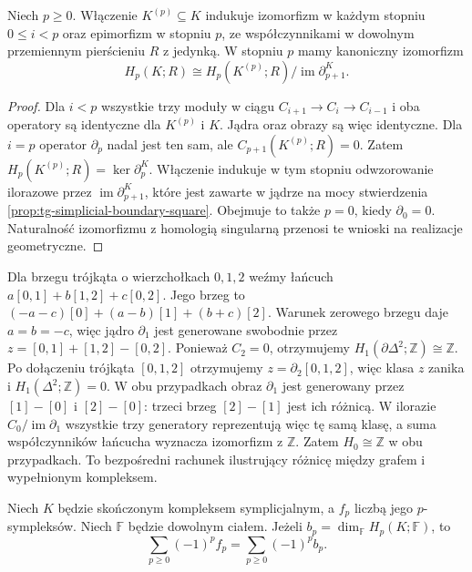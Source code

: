 \begin{wniosek}
\label{cor:tg-higher-skeleton-homology}
Niech $p\ge0$. Włączenie $K^{(p)}\subseteq K$
indukuje izomorfizm w każdym stopniu $0\le i<p$
oraz epimorfizm w stopniu $p$, ze współczynnikami
w dowolnym przemiennym pierścieniu $R$ z jedynką.
W stopniu $p$ mamy kanoniczny izomorfizm
\[
H_p(K;R)\cong
H_p(K^{(p)};R)/\operatorname{im}\partial_{p+1}^K.
\]
\end{wniosek}
\begin{proof}
Dla $i<p$ wszystkie trzy moduły w ciągu
$C_{i+1}\to C_i\to C_{i-1}$ i oba operatory
są identyczne dla $K^{(p)}$ i $K$.
Jądra oraz obrazy są więc identyczne.
Dla $i=p$ operator $\partial_p$ nadal jest ten sam,
ale $C_{p+1}(K^{(p)};R)=0$. Zatem
$H_p(K^{(p)};R)=\ker\partial_p^K$.
Włączenie indukuje w tym stopniu odwzorowanie
ilorazowe przez $\operatorname{im}\partial_{p+1}^K$,
które jest zawarte w jądrze na mocy
stwierdzenia \ref{prop:tg-simplicial-boundary-square}.
Obejmuje to także $p=0$, kiedy $\partial_0=0$.
Naturalność izomorfizmu z homologią singularną
przenosi te wnioski na realizacje geometryczne.
\end{proof}

\begin{przyklad}
Dla brzegu trójkąta o wierzchołkach $0,1,2$ weźmy łańcuch
$a[0,1]+b[1,2]+c[0,2]$. Jego brzeg to
$(-a-c)[0]+(a-b)[1]+(b+c)[2]$.
Warunek zerowego brzegu daje $a=b=-c$, więc jądro
$\partial_1$ jest generowane swobodnie przez
$z=[0,1]+[1,2]-[0,2]$. Ponieważ $C_2=0$, otrzymujemy
$H_1(\partial\Delta^2;\mathbb Z)\cong\mathbb Z$.
Po dołączeniu trójkąta $[0,1,2]$ otrzymujemy
$z=\partial_2[0,1,2]$, więc klasa $z$ zanika i
$H_1(\Delta^2;\mathbb Z)=0$. W obu przypadkach
obraz $\partial_1$ jest generowany przez $[1]-[0]$
i $[2]-[0]$: trzeci brzeg $[2]-[1]$ jest ich różnicą.
W ilorazie $C_0/\operatorname{im}\partial_1$ wszystkie
trzy generatory reprezentują więc tę samą klasę, a suma
współczynników łańcucha wyznacza izomorfizm z $\mathbb Z$.
Zatem $H_0\cong\mathbb Z$ w obu przypadkach. To bezpośredni rachunek ilustrujący
różnicę między grafem i wypełnionym kompleksem.
\end{przyklad}

\begin{stwierdzenie}
Niech $K$ będzie skończonym kompleksem symplicjalnym,
a $f_p$ liczbą jego $p$-sympleksów. Niech $\mathbb F$
będzie dowolnym ciałem. Jeżeli
$b_p=\dim_{\mathbb F}H_p(K;\mathbb F)$, to
\[
\sum_{p\ge0}(-1)^pf_p=\sum_{p\ge0}(-1)^pb_p.
\]
\end{stwierdzenie}

